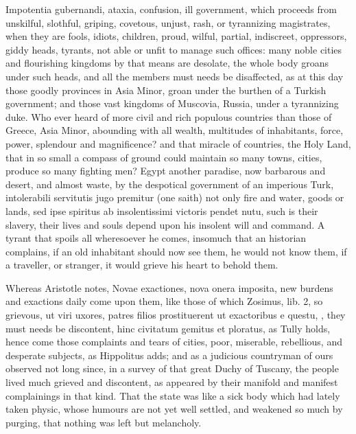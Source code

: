 {Impotentia gubernandi, ataxia, confusion, ill government, which
proceeds from unskilful, slothful, griping, covetous, unjust, rash, or
tyrannizing magistrates, when they are fools, idiots, children, proud,
wilful, partial, indiscreet, oppressors, giddy heads, tyrants, not able
or unfit to manage such offices: many noble cities and flourishing
kingdoms by that means are desolate, the whole body groans under such
heads, and all the members must needs be disaffected, as at this day
those goodly provinces in Asia Minor, \etc{} groan under the burthen of a
Turkish government; and those vast kingdoms of Muscovia, Russia,
under a tyrannizing duke. Who ever heard of more civil and rich
populous countries than those of Greece, Asia Minor, abounding with all
wealth, multitudes of inhabitants, force, power, splendour and
magnificence? and that miracle of countries, the Holy Land, that
in so small a compass of ground could maintain so many towns, cities,
produce so many fighting men? Egypt another paradise, now barbarous and
desert, and almost waste, by the despotical government of an imperious
Turk, intolerabili servitutis jugo premitur (one saith) not only
fire and water, goods or lands, sed ipse spiritus ab insolentissimi
victoris pendet nutu, such is their slavery, their lives and souls
depend upon his insolent will and command. A tyrant that spoils all
wheresoever he comes, insomuch that an historian complains, if an
old inhabitant should now see them, he would not know them, if a
traveller, or stranger, it would grieve his heart to behold them.

Whereas Aristotle notes, Novae exactiones, nova onera imposita,
new burdens and exactions daily come upon them, like those of which
Zosimus, lib. 2, so grievous, ut viri uxores, patres filios
prostituerent ut exactoribus e questu, \etc{}, they must needs be
discontent, hinc civitatum gemitus et ploratus, as  Tully holds,
hence come those complaints and tears of cities, poor, miserable,
rebellious, and desperate subjects, as Hippolitus adds; and
as a judicious countryman of ours observed not long since, in a
survey of that great Duchy of Tuscany, the people lived much grieved
and discontent, as appeared by their manifold and manifest complainings
in that kind. That the state was like a sick body which had lately
taken physic, whose humours are not yet well settled, and weakened so
much by purging, that nothing was left but melancholy.

}
